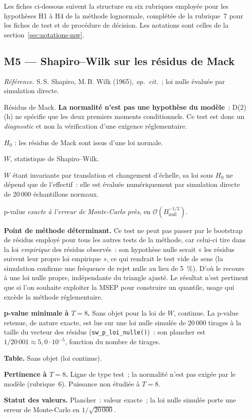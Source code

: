 \documentclass[a4paper,11pt]{article}
\newcommand{\code}[1]{\texttt{\small #1}}
\newcommand{\refl}[1]{{\small\textcolor{maincolor!70!black}{\textit{Référence.} #1}}\par\smallskip}
\newcounter{ficheid}
\newenvironment{fiche}[1]{%
  \stepcounter{ficheid}%
  \phantomsection
  \subsection{#1}%
  \label{fiche:\theficheid}%
}{%
  \end{description}\vspace{0.5em}%
}
\newcommand{\Cadre}{%
  \begin{description}[leftmargin=0pt, style=unboxed, itemsep=3pt, topsep=3pt, parsep=2pt]%
  \item[\textcolor{financeblue}{\textbf{1. Cadre, notations et hypothèses de validité (non testées).}}]}
\newcommand{\Hzero}{\item[\textcolor{financeblue}{\textbf{2. Hypothèse nulle.}}]}
\newcommand{\Stat}{\item[\textcolor{financeblue}{\textbf{3. Statistique de test.}}]}
\newcommand{\Loi}{\item[\textcolor{financeblue}{\textbf{4. Loi sous $H_0$.}}]}
\newcommand{\Pval}{\item[\textcolor{financeblue}{\textbf{5. p-value.}}]}
\newcommand{\Usage}{\item[\textcolor{financeblue}{\textbf{6. Usage et limites.}}]}
\newcommand{\Pertinence}{\item[\textcolor{financeblue}{\textbf{7. Pertinence et puissance à faible $T$.}}]}
\begin{document}
Les fiches ci-dessous suivent la structure en six rubriques employée pour les
hypothèses H1 à H4 de la méthode lognormale, complétée de la rubrique~7 pour les
fiches de test et de procédure de décision. Les notations sont celles de la
section~\ref{sec:notations-mw}.

\begin{fiche}{M5 --- Shapiro--Wilk sur les résidus de Mack}
\label{mw:m5sw}
\refl{S.\,S. Shapiro, M.\,B. Wilk (1965), \emph{op.\ cit.}~; loi nulle évaluée
par simulation directe.}
\Cadre
Résidus de Mack. \textbf{La normalité n'est pas une hypothèse du modèle}~:
D(2)(h) ne spécifie que les deux premiers moments conditionnels. Ce
test est donc un \emph{diagnostic} et non la vérification d'une exigence
réglementaire.
\Hzero
$H_0$ : les résidus de Mack sont issus d'une loi normale.
\Stat
$W$, statistique de Shapiro--Wilk.
\Loi
$W$ étant invariante par translation et changement d'échelle, sa loi sous $H_0$
ne dépend que de l'effectif~: elle est évaluée numériquement par simulation
directe de 20\,000 échantillons normaux.
\Pval
p-value \emph{exacte à l'erreur de Monte-Carlo près}, en
$\mathcal{O}(B_{\text{null}}^{-1/2})$.
\Usage
\textbf{Point de méthode déterminant.} Ce test ne peut pas passer par le
bootstrap de résidus employé pour tous les autres tests de la méthode, car
celui-ci tire dans la loi \emph{empirique} des résidus observés~: son hypothèse
nulle serait « les résidus suivent leur propre loi empirique », ce qui rendrait
le test vide de sens (la simulation confirme une fréquence de rejet nulle au
lieu de 5~\%). D'où le recours à une loi nulle propre, indépendante du triangle
ajusté. Le résultat n'est pertinent que si l'on souhaite exploiter la MSEP pour
construire un quantile, usage qui excède la méthode réglementaire.
\Pertinence
\textbf{p-value minimale à $T = 8$.} Sans objet pour la loi de $W$, continue. La p-value retenue, de nature exacte, est lue sur une loi nulle simulée de 20\,000 tirages à la taille du vecteur des résidus (\code{sw\_p\_loi\_nulle()})~: son plancher est $1/20\,001 \approx 5{,}0\cdot 10^{-5}$, fonction du nombre de tirages.

\textbf{Table.} Sans objet (loi continue).

\textbf{Pertinence à $T = 8$.} Ligne de type test~; la normalité n'est pas exigée par le modèle (rubrique~6). Puissance non étudiée à $T = 8$.

\textbf{Statut des valeurs.} Plancher~: valeur exacte~; la loi nulle simulée porte une erreur de Monte-Carlo en $1/\sqrt{20\,000}$.
\end{fiche}
\end{document}

